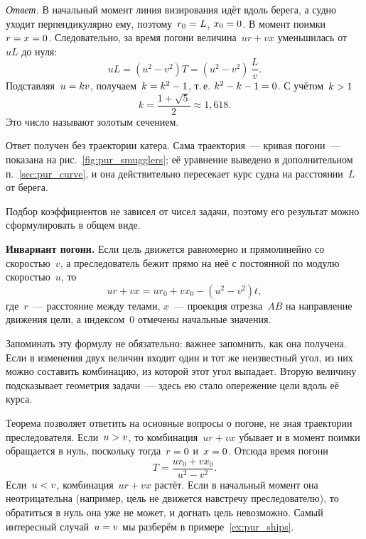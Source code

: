 \documentclass[../main.tex]{subfiles}
\begin{document}
\begin{example}
\noindent\textit{Ответ.} В начальный момент линия визирования идёт вдоль берега, а
судно уходит перпендикулярно ему, поэтому~$r_0 \hm= L$, $x_0 \hm= 0$. В момент поимки~$r \hm= x \hm= 0$. Следовательно, за время погони величина~$ur + vx$ уменьшилась от~$uL$
до нуля:
\[
uL = (u^2 - v^2)T = (u^2 - v^2)\,\frac{L}{v}.
\]
Подставляя~$u \hm= kv$, получаем~$k \hm= k^2 - 1$, т.\,е. $k^2 - k - 1 \hm= 0$. С учётом~$k >\nobreak 1$
\[
k = \frac{1 + \sqrt{5}}{2} \approx 1{,}618.
\]
Это число называют золотым сечением.

Ответ получен без траектории катера. Сама траектория~--- кривая погони~--- показана
на рис.~\ref{fig:pur_smugglers}; её уравнение выведено в дополнительном
п.~\ref{sec:pur_curve}, и она действительно пересекает курс судна на расстоянии~$L$
от берега.
\end{example}

Подбор коэффициентов не зависел от чисел задачи, поэтому его результат можно
сформулировать в общем виде.

\begin{theorem}
\textbf{Инвариант погони.} Если цель движется равномерно и прямолинейно со
скоростью~$v$, а преследователь бежит прямо на неё с постоянной по модулю скоростью~$u$, то
\[
ur + vx = ur_0 + vx_0 - (u^2 - v^2)t,
\]
где~$r$~--- расстояние между телами, $x$~--- проекция отрезка~$AB$ на направление
движения цели, а индексом~$0$ отмечены начальные значения.
\end{theorem}

Запоминать эту формулу не обязательно: важнее запомнить, как она получена. Если в
изменения двух величин входит один и тот же неизвестный угол, из них можно составить
комбинацию, из которой этот угол выпадает. Вторую величину подсказывает геометрия
задачи~--- здесь ею стало опережение цели вдоль её курса.

Теорема позволяет ответить на основные вопросы о погоне, не зная траектории
преследователя. Если~$u >\nobreak v$, то комбинация~$ur + vx$ убывает и в момент поимки
обращается в нуль, поскольку тогда~$r \hm= 0$ и~$x \hm= 0$. Отсюда время погони
\[
T = \frac{ur_0 + vx_0}{u^2 - v^2}.
\]
Если~$u <\nobreak v$, комбинация~$ur + vx$ растёт. Если в начальный момент она
неотрицательна (например, цель не движется навстречу преследователю), то обратиться в
нуль она уже не может, и догнать цель невозможно.
Самый интересный случай~$u \hm= v$ мы разберём в примере~\ref{ex:pur_ships}.
\end{document}
